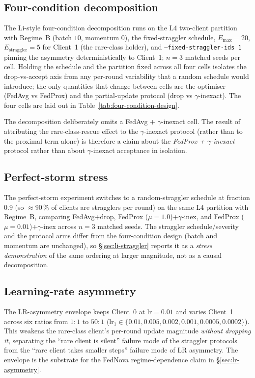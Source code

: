 \documentclass[11pt,a4paper]{report}
\begin{document}
\subsection{Four-condition decomposition}

The Li-style four-condition decomposition runs on the L4 two-client
partition with Regime~B (batch $10$, momentum $0$), the fixed-straggler
schedule, $E_{\max} = 20$, $E_{\textrm{straggler}} = 5$ for Client~1
(the rare-class holder), and \texttt{--fixed-straggler-ids 1} pinning
the asymmetry deterministically to Client~1; $n = 3$ matched seeds per
cell. Holding the schedule and the partition fixed across all four
cells isolates the drop-vs-accept axis from any per-round variability
that a random schedule would introduce; the only quantities that change
between cells are the optimiser (FedAvg vs FedProx) and the
partial-update protocol (drop vs $\gamma$-inexact). The four cells are
laid out in Table~\ref{tab:four-condition-design}.

The decomposition deliberately omits a FedAvg + $\gamma$-inexact cell.
The result of attributing the rare-class-rescue effect to the
$\gamma$-inexact protocol (rather than to the proximal term alone) is
therefore a claim about the \emph{FedProx + $\gamma$-inexact} protocol
rather than about $\gamma$-inexact acceptance in isolation.

\subsection{Perfect-storm stress}

The perfect-storm experiment switches to a random-straggler schedule at
fraction $0.9$ (so $\approx 90\,\%$ of clients are stragglers per
round) on the same L4 partition with Regime~B, comparing FedAvg+drop,
FedProx ($\mu = 1.0$)+$\gamma$-inex, and FedProx ($\mu = 0.01$)+$\gamma$-inex
across $n = 3$ matched seeds. The straggler schedule/severity and the
protocol arms differ from the four-condition design (batch and momentum
are unchanged), so §\ref{sec:li-straggler} reports it as a \emph{stress
demonstration} of the same ordering at larger magnitude, not as a
causal decomposition.

\subsection{Learning-rate asymmetry}

The LR-asymmetry envelope keeps Client~0 at $\textrm{lr} = 0.01$ and
varies Client~1 across six ratios from $1{:}1$ to $50{:}1$
($\textrm{lr}_1 \in \{0.01, 0.005, 0.002, 0.001, 0.0005, 0.0002\}$).
This weakens the rare-class client's per-round update magnitude
\emph{without dropping it}, separating the ``rare client is silent''
failure mode of the straggler protocols from the ``rare client takes
smaller steps'' failure mode of LR asymmetry. The envelope is the
substrate for the FedNova regime-dependence claim in
§\ref{sec:lr-asymmetry}.
\end{document}
